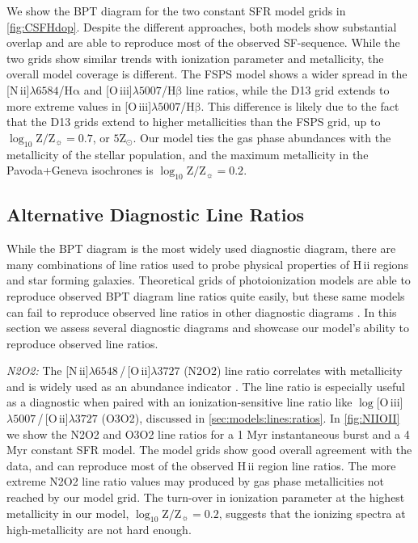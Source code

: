 \documentclass[linenumbers, tighten, trackchanges]{aastex61}%
\newcommand{\Fig}[1]{\autoref{fig:#1}}
\newcommand{\Sec}[1]{\autoref{sec:#1}}
\newcommand{\logten}{\ensuremath{\log_{10}}}
\newcommand{\nii}{[N\,{\sc ii}]\xspace}
\newcommand{\oiii}{[O\,{\sc iii}]\xspace}
\newcommand{\oii}{[O\,{\sc ii}]\xspace}
\newcommand{\ha}{\ensuremath{\mathrm{H\alpha}}}
\newcommand{\hb}{\ensuremath{\mathrm{H\beta}}}
\newcommand{\hii}{H\,{\sc ii}\xspace}
\newcommand\lam[1]{\ensuremath{\lambda #1}}
\newcommand{\logZeq}[1]{\ensuremath{\logten \mathrm{Z}/\mathrm{Z}_{\sun} = #1}}
\newcommand\niiha{\nii{}\lam{6584}/\ha{}}
\newcommand\oiiihb{\oiii{}\lam{5007}/\hb{}}
\begin{document}
We show the BPT diagram for the two constant SFR model grids in \Fig{CSFHdop}. Despite the different approaches, both models show substantial overlap and are able to reproduce most of the observed SF-sequence. While the two grids show similar trends with ionization parameter and metallicity, the overall model coverage is different. The FSPS model shows a wider spread in the \niiha{} and \oiiihb{} line ratios, while the D13 grid extends to more extreme values in \oiiihb{}. This difference is likely due to the fact that the D13 grids extend to higher metallicities than the FSPS grid, up to \logZeq{0.7}, or $5\mathrm{Z}_{\odot}$. Our model ties the gas phase abundances with the metallicity of the stellar population, and the maximum metallicity in the Pavoda+Geneva isochrones is \logZeq{0.2}.

\subsection{Alternative Diagnostic Line Ratios}\label{sec:models:discussion}

While the BPT diagram is the most widely used diagnostic diagram, there are many combinations of line ratios used to probe physical properties of \hii regions and star forming galaxies. Theoretical grids of photoionization models are able to reproduce observed BPT diagram line ratios quite easily, but these same models can fail to reproduce observed line ratios in other diagnostic diagrams \citep[e.g., ][]{Telford16}. In this section we assess several diagnostic diagrams and showcase our model's ability to reproduce observed line ratios.

{\it N2O2:} The \nii\lam{6548}\,/\,\oii\lam{3727} (N2O2) line ratio correlates with metallicity and is widely used as an abundance indicator \citep{Levesque10, Dopita00, VO87}. The line ratio is especially useful as a diagnostic when paired with an ionization-sensitive line ratio like $\log$\oiii\lam{5007}\,/\,\oii\lam{3727} (O3O2), discussed in \Sec{models:lines:ratios}. In \Fig{NIIOII} we show the N2O2 and O3O2 line ratios for a 1 Myr instantaneous burst and a 4 Myr constant SFR model. The model grids show good overall agreement with the data, and can reproduce most of the observed \hii region line ratios. The more extreme N2O2 line ratio values may produced by gas phase metallicities not reached by our model grid. The turn-over in ionization parameter at the highest metallicity in our model, \logZeq{0.2}, suggests that the ionizing spectra at high-metallicity are not hard enough.
\end{document}
